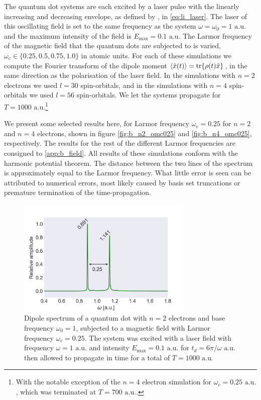 The quantum dot systems are each excited by a laser pulse with the linearly increasing 
and decreasing envelope, as defined by \citeauthor{li2005time} \cite{li2005time}, in 
\autoref{eq:li_laser}. The laser of this oscillating field is set to the 
same frequency as the system $\omega=\omega_0=1 \text{ a.u.}$ and the maximum intensity of the field 
is $E_\text{max} = 0.1 \text{ a.u.}$ The Larmor frequency of the magnetic field that the 
quantum dots are subjected to is varied, $\omega_c\in\{0.25, 0.5, 0.75, 1.0\}$
in atomic units.
For each of these simulations we compute the Fourier transform of the dipole moment
$\ev{\hat{x}(t)} =\tr{\rho(t) \hat{x}}$, in 
the same direction as the polarisation of the laser field.
In the simulations with $n=2$ electrons we used $l=30$ spin-orbitals,
and in the simulations with $n=4$ spin-orbitals we used $l=56$ spin-orbitals.
We let the systems propagate for $T = 1000 \text{ a.u.}$\footnote{With the notable 
exception of the $n=4$ electron simulation for $\omega_c=0.25 \text{ a.u.}$, which was terminated 
at $T=700 \text{ a.u.}$.}

We present some selected results here, for Larmor frequency $\omega_c=0.25$ for 
$n=2$ and $n=4$ electrons, shown in figure \autoref{fig:b_n2_omc025}
and \autoref{fig:b_n4_omc025}, respectively.
The results for 
the rest of the different Larmor frequencies are consigned to \autoref{app:b_field}.
All results of these simulations conform with the harmonic potential theorem. The 
distance between the two lines of the spectrum is approximately equal to the 
Larmor frequency. What little error is seen can be attributed to numerical errors,
most likely caused by basis set truncations or premature termination of the
time-propagation.

\begin{figure}
    \centering
    \includegraphics[width=0.75\textwidth]
        {results/figures/B_field/n=2/b_spectrum_omc025.png}
    \caption{Dipole spectrum of a quantum dot with $n=2$ electrons and base frequency 
        $\omega_0 = 1$,
        subjected to a magnetic field with Larmor frequency $\omega_c=0.25$. The 
        system was excited with a laser field with frequency $\omega = 1 \text{ a.u.}$ 
        and intensity $E_\text{max} = 0.1 \text{ a.u.}$ for $t_d = 6\pi/\omega \text{ a.u.}$ then 
        allowed to propagate in time for a total of $T=1000 \text{ a.u.}$} 
    \label{fig:b_n2_omc025}
\end{figure}

